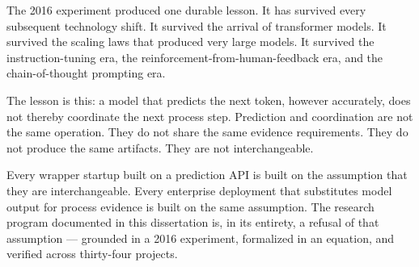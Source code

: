 The 2016 experiment produced one durable lesson. It has survived every subsequent technology shift. It survived the arrival of transformer models. It survived the scaling laws that produced very large models. It survived the instruction-tuning era, the reinforcement-from-human-feedback era, and the chain-of-thought prompting era.

The lesson is this: a model that predicts the next token, however accurately, does not thereby coordinate the next process step. Prediction and coordination are not the same operation. They do not share the same evidence requirements. They do not produce the same artifacts. They are not interchangeable.

Every wrapper startup built on a prediction API is built on the assumption that they are interchangeable. Every enterprise deployment that substitutes model output for process evidence is built on the same assumption. The research program documented in this dissertation is, in its entirety, a refusal of that assumption --- grounded in a 2016 experiment, formalized in an equation, and verified across thirty-four projects.
